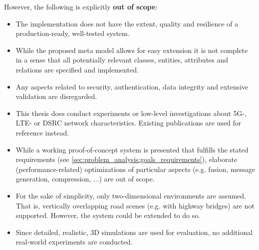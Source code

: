 However, the following is explicitly \textbf{out of scope}:
\begin{itemize}
	\item The implementation does not have the extent, quality and resilience of a production-ready, well-tested system.
	\item While the proposed meta model allows for easy extension it is not complete in a sense that all potentially relevant classes, entities, attributes and relations are specified and implemented.
	\item Any aspects related to security, authentication, data integrity and extensive validation are disregarded.
	\item This thesis does conduct experiments or low-level investigations about 5G-, LTE- or DSRC network characteristics. Existing publications are used for reference instead.
	\item While a working proof-of-concept system is presented that fulfills the stated requirements (see \cref{sec:problem_analysis:goals_requirements}), elaborate (performance-related) optimizations of particular aspects (e.g. fusion, message generation, compression, ...) are out of scope.
	\item For the sake of simplicity, only two-dimensional environments are assumed. That is, vertically overlapping road scenes (e.g. with highway bridges) are not supported. However, the system could be extended to do so.
	\item Since detailed, realistic, 3D simulations are used for evaluation, no additional real-world experiments are conducted.
\end{itemize}